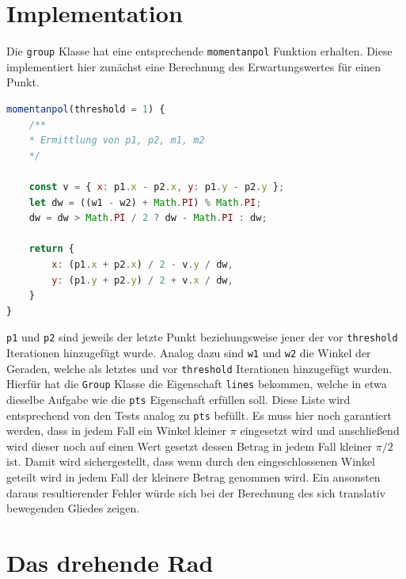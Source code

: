 \section{Implementation}

Die \lstinline{group} Klasse hat eine entsprechende \lstinline{momentanpol} Funktion erhalten.
Diese implementiert hier zunächst eine Berechnung des Erwartungswertes für einen Punkt.

\begin{lstlisting}[language=JavaScript, caption={Definition der \lstinline{momentanpol} Funktion, welche in der \lstinline{group} Klasse definiert ist Die Ermittlung der Punkte \lstinline{p1} und \lstinline{p2} sowie der Winkel \lstinline{w1} und \lstinline{w2} wurde hier aus Platzgründen weggelassen.}, label={lst:group_momentanpol}]
momentanpol(threshold = 1) {
    /**
    * Ermittlung von p1, p2, m1, m2
    */

    const v = { x: p1.x - p2.x, y: p1.y - p2.y };
    let dw = ((w1 - w2) + Math.PI) % Math.PI;
    dw = dw > Math.PI / 2 ? dw - Math.PI : dw;

    return {
        x: (p1.x + p2.x) / 2 - v.y / dw,
        y: (p1.y + p2.y) / 2 + v.x / dw,
    }
}
\end{lstlisting}

\lstinline{p1} und \lstinline{p2} sind jeweils der letzte Punkt beziehungsweise jener der vor \lstinline{threshold} Iterationen hinzugefügt wurde.
Analog dazu sind \lstinline{w1} und \lstinline{w2} die Winkel der Geraden, welche als letztes und vor \lstinline{threshold} Iterationen hinzugefügt wurden.
Hierfür hat die \lstinline{Group} Klasse die Eigenschaft \lstinline{lines} bekommen, welche in etwa dieselbe Aufgabe wie die \lstinline{pts} Eigenschaft erfüllen soll.
Diese Liste wird entsprechend von den Tests analog zu \lstinline{pts} befüllt.
Es muss hier noch garantiert werden, dass in jedem Fall ein Winkel kleiner $\pi$ eingesetzt wird und anschlie{\ss}end wird dieser noch auf einen Wert gesetzt dessen Betrag in jedem Fall kleiner $\pi / 2$ ist.
Damit wird sichergestellt, dass wenn durch den eingeschlossenen Winkel geteilt wird in jedem Fall der kleinere Betrag genommen wird.
Ein ansonsten daraus resultierender Fehler würde sich bei der Berechnung des sich translativ bewegenden Gliedes zeigen.

\section{Das drehende Rad}\label{ch:drehendesRad}

